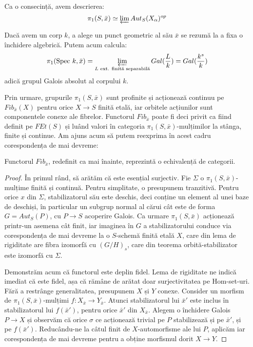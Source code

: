 \documentclass[13pt,openany]{book}
\begin{document}
Ca o consecință, avem descrierea:
$$\pi_1(S,\bar{x}) \simeq \varprojlim Aut_S(X_\alpha)^{op}$$

\begin{ex}
Dacă avem un corp $k$, a alege un punct geometric al său $\bar{x}$ se rezumă la a fixa o închidere algebrică. Putem acum calcula:
$$\pi_1(\text{Spec }k,\bar{x})=\varprojlim\limits_{L \text{ ext. finită separabilă}} Gal(\frac{L}{k}) = Gal(\frac{k^s}{k})$$
adică grupul Galois absolut al corpului $k$.
\end{ex}

Prin urmare, grupurile $\pi_1(S,\bar{x})$ sunt profinite și acționează continuu pe $Fib_{\bar{x}}(X)$ pentru orice $X \rightarrow S$ finită etală, iar orbitele acțiunilor sunt componentele conexe ale fibrelor. Functorul $Fib_{\bar{x}}$ poate fi deci privit ca fiind definit pe $FEt(S)$ și luând valori în categoria $\pi_1(S,\bar{x})$-mulțimilor la stânga, finite și continue. Am ajuns acum să putem reexprima în acest cadru corespondența de mai devreme:

\begin{teo}
Functorul $Fib_{\bar{x}}$, redefinit ca mai înainte, reprezintă o echivalență de categorii.
\end{teo}

\begin{proof}
În primul rând, să arătăm că este esențial surjectiv. Fie $\Sigma$ o $\pi_1(S,\bar{x})$-mulțime finită și continuă. Pentru simplitate, o presupunem tranzitivă. Pentru orice $x$ din $\Sigma$, stabilizatorul său este deschis, deci conține un element al unei baze de deschiși, în particular un subgrup normal al cărui cât este de forma $G=Aut_S(P)$, cu $P \rightarrow S$ acoperire Galois. Ca urmare $\pi_1(S,\bar{x})$ acționează printr-un asemena cât finit, iar imaginea în $G$ a stabilizatorului conduce via corespondența de mai devreme la o $S$-schemă finită etală $X$, care din lema de rigiditate are fibra izomorfă cu $(G/H)_s$, care din teorema orbită-stabilizator este izomorfă cu $\Sigma$.

Demonstrăm acum că functorul este deplin fidel. Lema de rigiditate ne indică imediat că este fidel, așa că rămâne de arătat doar surjectivitatea pe Hom-set-uri. Fără a restrânge generalitatea, presupunem $X$ și $Y$ conexe. Consider un morfism de $\pi_1(S,\bar{x})$-mulțimi $f:X_{\bar{x}} \rightarrow Y_{\bar{x}}$. Atunci stabilizatorul lui $\bar{x}'$ este inclus în stabilizatorul lui $f(\bar{x}')$, pentru orice $\bar{x}'$ din $X_{\bar{x}}$. Alegem o închidere Galois $P \rightarrow X$ și observăm că orice $\sigma$ ce acționează trivial pe $P$ stabilizează și pe $\bar{x}'$, și pe $f(\bar{x}')$. Reducându-ne la câtul finit de $X$-automorfisme ale lui $P$, aplicăm iar corespondența de mai devreme pentru a obține morfismul dorit $X \rightarrow Y$.
\end{proof}
\end{document}
